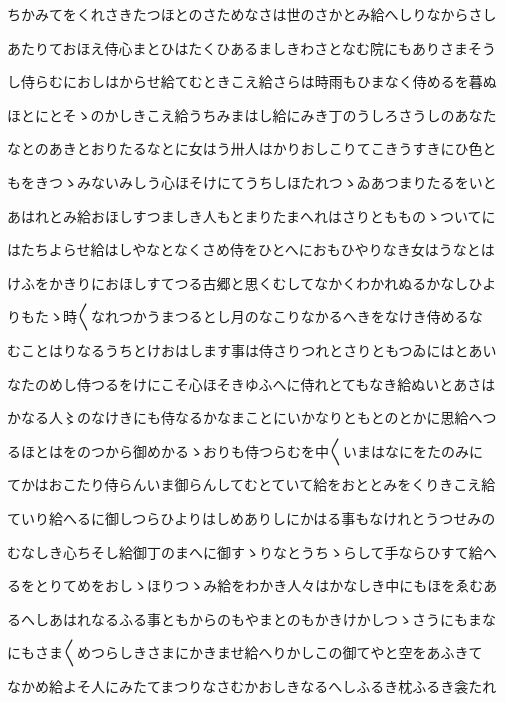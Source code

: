 \documentclass[a4paper,11pt,landscape]{ltjtarticle}
\begin{document}
\par\medskip
ちかみてをくれさきたつほとのさためなさは世のさかとみ給へしりなからさし
\par\medskip
あたりておほえ侍心まとひはたくひあるましきわさとなむ院にもありさまそう
\par\medskip
し侍らむにおしはからせ給てむときこえ給さらは時雨もひまなく侍めるを暮ぬ
\par\medskip
ほとにとそゝのかしきこえ給うちみまはし給にみき丁のうしろさうしのあなた
\par\medskip
なとのあきとおりたるなとに女はう卅人はかりおしこりてこきうすきにひ色と
\par\medskip
もをきつゝみないみしう心ほそけにてうちしほたれつゝゐあつまりたるをいと
\par\medskip
あはれとみ給おほしすつましき人もとまりたまへれはさりともものゝついてに
\par\medskip
はたちよらせ給はしやなとなくさめ侍をひとへにおもひやりなき女はうなとは
\par\medskip
けふをかきりにおほしすてつる古郷と思くむしてなかくわかれぬるかなしひよ
\par\medskip
りもたゝ時〱なれつかうまつるとし月のなこりなかるへきをなけき侍めるな
\par\medskip
むことはりなるうちとけおはします事は侍さりつれとさりともつゐにはとあい
\par\medskip
なたのめし侍つるをけにこそ心ほそきゆふへに侍れとてもなき給ぬいとあさは
\par\medskip
かなる人〻のなけきにも侍なるかなまことにいかなりともとのとかに思給へつ
\par\medskip
るほとはをのつから御めかるゝおりも侍つらむを中〱いまはなにをたのみに
\par\medskip
てかはおこたり侍らんいま御らんしてむとていて給をおととみをくりきこえ給
\par\medskip
ていり給へるに御しつらひよりはしめありしにかはる事もなけれとうつせみの
\par\medskip
むなしき心ちそし給御丁のまへに御すゝりなとうちゝらして手ならひすて給へ
\par\medskip
るをとりてめをおしゝほりつゝみ給をわかき人々はかなしき中にもほをゑむあ
\par\medskip
るへしあはれなるふる事ともからのもやまとのもかきけかしつゝさうにもまな
\par\medskip
にもさま〱めつらしきさまにかきませ給へりかしこの御てやと空をあふきて
\par\medskip
なかめ給よそ人にみたてまつりなさむかおしきなるへしふるき枕ふるき衾たれ
\par\medskip
\end{document}
